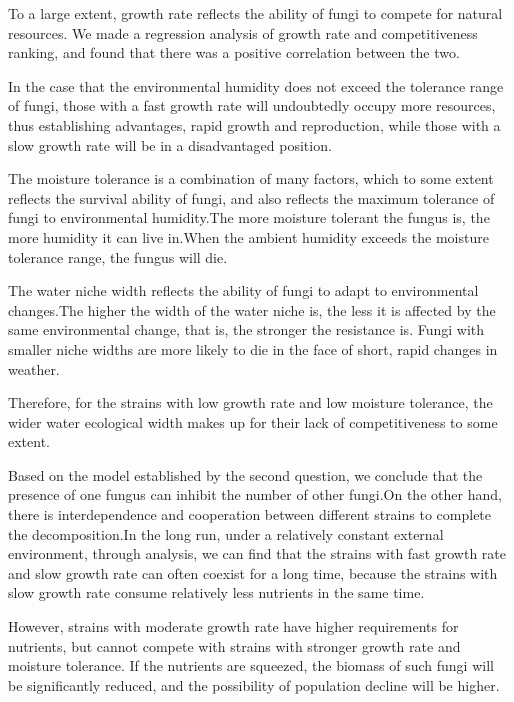 \documentclass[12pt]{article}
\begin{document}
To a large extent, growth rate reflects the ability of fungi to compete for natural resources. We made a regression analysis of growth rate and competitiveness ranking, and found that there was a positive correlation between the two. \par 

In the case that the environmental humidity does not exceed the tolerance range of fungi, those with a fast growth rate will undoubtedly occupy more resources, thus establishing advantages, rapid growth and reproduction, while those with a slow growth rate will be in a disadvantaged position.\par 

The moisture tolerance is a combination of many factors, which to some extent reflects the survival ability of fungi, and also reflects the maximum tolerance of fungi to environmental humidity.The more moisture tolerant the fungus is, the more humidity it can live in.When the ambient humidity exceeds the moisture tolerance range, the fungus will die.\par 

The water niche width reflects the ability of fungi to adapt to environmental changes.The higher the width of the water niche is, the less it is affected by the same environmental change, that is, the stronger the resistance is. Fungi with smaller niche widths are more likely to die in the face of short, rapid changes in weather. \par 

Therefore, for the strains with low growth rate and low moisture tolerance, the wider water ecological width makes up for their lack of competitiveness to some extent.\par 

Based on the model established by the second question, we conclude that the presence of one fungus can inhibit the number of other fungi.On the other hand, there is interdependence and cooperation between different strains to complete the decomposition\cite{13}.In the long run, under a relatively constant external environment, through analysis, we can find that the strains with fast growth rate and slow growth rate can often coexist for a long time, because the strains with slow growth rate consume relatively less nutrients in the same time.\par 

However, strains with moderate growth rate have higher requirements for nutrients, but cannot compete with strains with stronger growth rate and moisture tolerance. If the nutrients are squeezed, the biomass of such fungi will be significantly reduced, and the possibility of population decline will be higher.\par 
\end{document}
